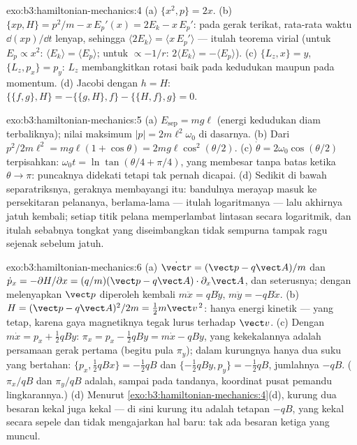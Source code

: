 \begin{solution}{exo:b3:hamiltonian-mechanics:4}
(a) $\{x^2, p\} = 2x$. (b) $\{xp, H\} = p^2/m - x\,E_p'(x) = 2E_k -
x\,E_p'$: pada gerak terikat, rata-rata waktu $\dd(xp)/\dd t$ lenyap,
sehingga $\langle 2E_k\rangle = \langle x\,E_p'\rangle$ --- itulah
teorema virial (untuk $E_p \propto x^2$: $\langle E_k\rangle = \langle
E_p\rangle$; untuk $\propto -1/r$: $2\langle E_k\rangle = -\langle
E_p\rangle$). (c) $\{L_z, x\} = y$, $\{L_z, p_x\} = p_y$: $L_z$
membangkitkan rotasi baik pada kedudukan maupun pada momentum. (d)
Jacobi dengan $h
= H$: $\{\{f, g\}, H\} = -\{\{g, H\}, f\} - \{\{H, f\}, g\} = 0$.
\end{solution}

\begin{solution}{exo:b3:hamiltonian-mechanics:5}
(a) $E_{\text{sep}} = mg\ell$ (energi kedudukan diam terbaliknya);
nilai maksimum $|p| = 2m\ell^2\omega_0$ di dasarnya. (b) Dari
$p^2/2m\ell^2 = mg\ell(1 + \cos\theta) = 2mg\ell\cos^2(\theta/2)$. (c)
$\dot\theta = 2\omega_0\cos(\theta/2)$ terpisahkan: $\omega_0t =
\ln\tan(\theta/4 + \pi/4)$, yang membesar tanpa batas ketika $\theta \to \pi$:
puncaknya didekati tetapi tak pernah dicapai. (d) Sedikit di bawah
separatriksnya, geraknya membayangi  itu: bandulnya merayap
masuk ke persekitaran pelananya, berlama-lama --- itulah logaritmanya
--- lalu akhirnya jatuh kembali; setiap titik pelana memperlambat
lintasan secara logaritmik, dan itulah sebabnya tongkat yang
diseimbangkan tidak sempurna tampak ragu sejenak sebelum jatuh.
\end{solution}

\begin{solution}{exo:b3:hamiltonian-mechanics:6}
(a) $\dot{\vect r} = (\vect p - q\vect A)/m$ dan $\dot p_x =
-\partial H/\partial x = (q/m)(\vect p - q\vect A)\cdot\partial_x\vect
A$, dan seterusnya; dengan melenyapkan $\vect p$ diperoleh kembali $m\ddot x = qB\dot y$,
$m\ddot y = -qB\dot x$. (b) $H = (\vect p - q\vect A)^2/2m = \tfrac12
m\vect v^{\,2}$: hanya energi kinetik --- yang tetap, karena gaya
magnetiknya tegak lurus terhadap $\vect v$. (c) Dengan $m\dot x = p_x +
\tfrac12 qBy$: $\pi_x = p_x - \tfrac12 qBy = m\dot x - qBy$, yang
kekekalannya adalah persamaan gerak pertama (begitu pula $\pi_y$); dalam
kurungnya hanya dua suku yang bertahan: $\{p_x, \tfrac12 qBx\} = -\tfrac12
qB$ dan $\{-\tfrac12 qBy, p_y\} = -\tfrac12 qB$, jumlahnya $-qB$. ($\pi_x/qB$ dan $\pi_y/qB$
adalah, sampai pada tandanya, koordinat pusat pemandu lingkarannya.)
(d) Menurut \cref{exo:b3:hamiltonian-mechanics:4}(d), kurung dua besaran
kekal juga kekal --- di sini kurung itu adalah tetapan
$-qB$, yang kekal secara sepele dan tidak mengajarkan hal baru: tak ada
besaran ketiga yang muncul.
\end{solution}


